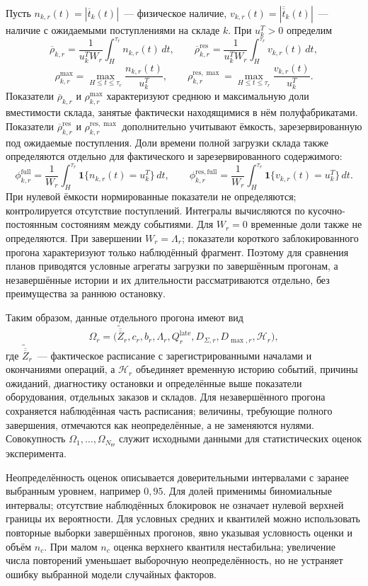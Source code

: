 Пусть $n_{k,r}(t)=|\overline{t}_k(t)|$~--- физическое наличие, $v_{k,r}(t)=|\overline{\overline{t}}_k(t)|$~--- наличие с ожидаемыми поступлениями на складе $k$. При $u^T_k>0$ определим
\[
\overline{\rho}_{k,r}=\frac{1}{u^T_k W_r}\int_H^{\tau_r}n_{k,r}(t)\,dt,
\qquad
\overline{\rho}^{\mathrm{res}}_{k,r}=\frac{1}{u^T_k W_r}\int_H^{\tau_r}v_{k,r}(t)\,dt,
\]
\[
\rho^{\max}_{k,r}=\max_{H\leq t\leq\tau_r}\frac{n_{k,r}(t)}{u^T_k},\qquad
\rho^{\mathrm{res},\max}_{k,r}=\max_{H\leq t\leq\tau_r}\frac{v_{k,r}(t)}{u^T_k}.
\]
Показатели $\overline{\rho}_{k,r}$ и $\rho^{\max}_{k,r}$ характеризуют среднюю и максимальную доли вместимости склада, занятые фактически находящимися в нём полуфабрикатами. Показатели $\overline{\rho}^{\mathrm{res}}_{k,r}$ и $\rho^{\mathrm{res},\max}_{k,r}$ дополнительно учитывают ёмкость, зарезервированную под ожидаемые поступления. Доли времени полной загрузки склада также определяются отдельно для фактического и зарезервированного содержимого:
\[
\phi^{\mathrm{full}}_{k,r}=\frac{1}{W_r}\int_H^{\tau_r}\mathbf{1}\{n_{k,r}(t)=u^T_k\}\,dt,
\qquad
\phi^{\mathrm{res,full}}_{k,r}=\frac{1}{W_r}\int_H^{\tau_r}\mathbf{1}\{v_{k,r}(t)=u^T_k\}\,dt.
\]
При нулевой ёмкости нормированные показатели не определяются; контролируется отсутствие поступлений. Интегралы вычисляются по кусочно-постоянным состояниям между событиями. Для $W_r=0$ временные доли также не определяются. При завершении $W_r=\Lambda_r$; показатели короткого заблокированного прогона характеризуют только наблюдённый фрагмент. Поэтому для сравнения планов приводятся условные агрегаты загрузки по завершённым прогонам, а незавершённые истории и их длительности рассматриваются отдельно, без преимущества за раннюю остановку.

Таким образом, данные отдельного прогона имеют вид
\[
\Omega_r=\bigl(\widetilde{\overline{\overline{Z}}}_r,c_r,b_r,
\Lambda_r,Q^{\mathrm{late}}_r,D_{\Sigma,r},D_{\max,r},\mathcal{H}_r\bigr),
\]
где $\widetilde{\overline{\overline{Z}}}_r$~--- фактическое расписание с зарегистрированными началами и окончаниями операций, а $\mathcal{H}_r$ объединяет временную историю событий, причины ожиданий, диагностику остановки и определённые выше показатели оборудования, отдельных заказов и складов. Для незавершённого прогона сохраняется наблюдённая часть расписания; величины, требующие полного завершения, отмечаются как неопределённые, а не заменяются нулями. Совокупность $\Omega_1,\ldots,\Omega_{N_{\Theta}}$ служит исходными данными для статистических оценок эксперимента.

Неопределённость оценок описывается доверительными интервалами с заранее выбранным уровнем, например $0{,}95$. Для долей применимы биномиальные интервалы; отсутствие наблюдённых блокировок не означает нулевой верхней границы их вероятности. Для условных средних и квантилей можно использовать повторные выборки завершённых прогонов, явно указывая условность оценки и объём $n_c$. При малом $n_c$ оценка верхнего квантиля нестабильна; увеличение числа повторений уменьшает выборочную неопределённость, но не устраняет ошибку выбранной модели случайных факторов.

